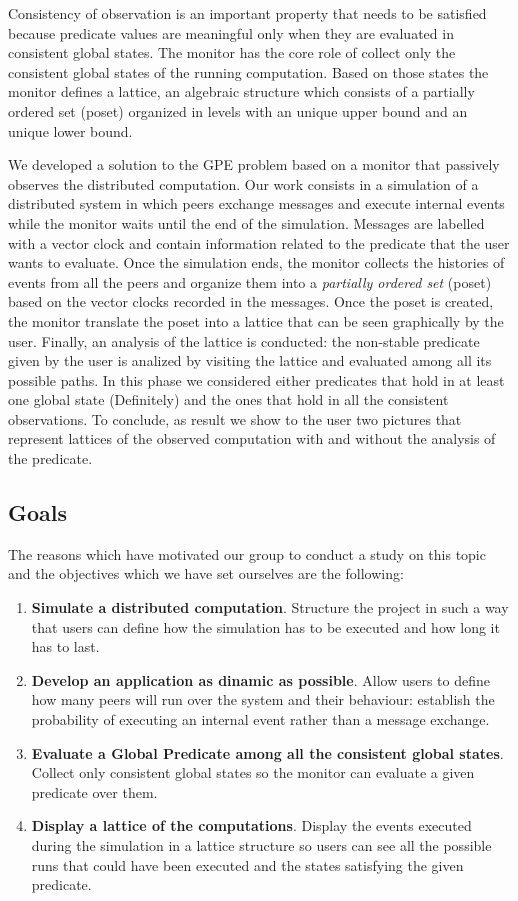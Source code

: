 \documentclass[10pt]{article}
\begin{document}
Consistency of observation is an important property that needs to be satisfied because predicate values are meaningful only when they are evaluated in consistent global states. The monitor has the core role of collect only the consistent global states of the running computation. Based on those states the monitor defines a lattice, an algebraic structure which consists of a partially ordered set (poset) organized in levels with an unique upper bound and an unique lower bound.

We developed a solution to the GPE problem based on a monitor that passively observes the distributed computation. Our work consists in a simulation of a distributed system in which peers exchange messages and execute internal events while the monitor waits until the end of the simulation. Messages are labelled with a vector clock and contain information related to the predicate that the user wants to evaluate. Once the simulation ends, the monitor collects the histories of events from all the peers and organize them into a \textit{partially ordered set} (poset) based on the vector clocks recorded in the messages. Once the poset is created, the monitor translate the poset into a lattice that can be seen graphically by the user. Finally, an analysis of the lattice is conducted: the non-stable predicate given by the user is analized by visiting the lattice and evaluated among all its possible paths. In this phase we considered either predicates that hold in at least one global state (Definitely) and the ones that hold in all the consistent observations. To conclude, as result we show to the user two pictures that represent lattices of the observed computation with and without the analysis of the predicate.

\subsection{Goals}

The reasons which have motivated our group to conduct a study on this topic and the objectives which we have set ourselves are the following:
\begin{enumerate}
\item \textbf{Simulate a distributed computation}. Structure the project in such a way that users can define how the simulation has to be executed and how long it has to last.
\item \textbf{Develop an application as dinamic as possible}. Allow users to define how many peers will run over the system and their behaviour: establish the probability of executing an internal event rather than a message exchange.
\item \textbf{Evaluate a Global Predicate among all the consistent global states}. Collect only consistent global states so the monitor can evaluate a given predicate over them.
\item \textbf{Display a lattice of the computations}. Display the events executed during the simulation in a lattice structure so users can see all the possible runs that could have been executed and the states satisfying the given predicate.
\end{enumerate}
\end{document}

